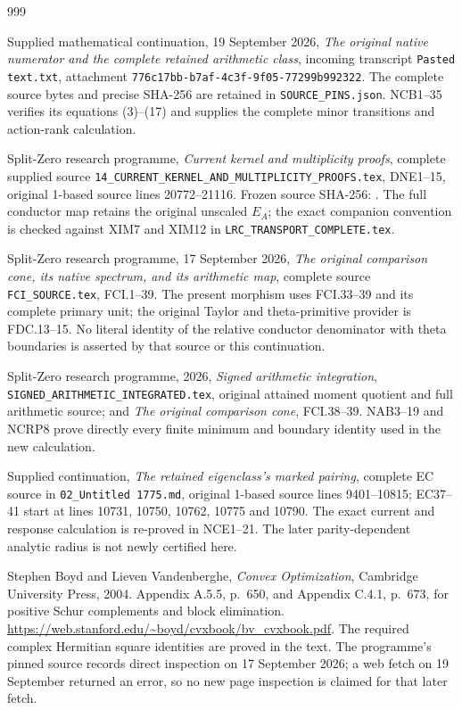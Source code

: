 \begin{thebibliography}{999}

Supplied mathematical continuation, 19 September 2026,
\emph{The original native numerator and the complete retained arithmetic class},
incoming transcript \texttt{Pasted text.txt}, attachment
\texttt{776c17bb-b7af-4c3f-9f05-77299b992322}.
The complete source bytes and precise SHA-256 are retained in
\texttt{SOURCE\_PINS.json}. NCB1--35 verifies its equations (3)--(17)
and supplies the complete minor transitions and action-rank calculation.

Split-Zero research programme, \emph{Current kernel and multiplicity proofs},
complete supplied source \texttt{14\_CURRENT\_KERNEL\_AND\_MULTIPLICITY\_PROOFS.tex},
DNE1--15, original 1-based source lines 20772--21116.
Frozen source SHA-256:
.
The full conductor map retains the original unscaled $E_A$;
the exact companion convention is checked against XIM7 and XIM12
in \texttt{LRC\_TRANSPORT\_COMPLETE.tex}.

Split-Zero research programme, 17 September 2026,
\emph{The original comparison cone, its native spectrum, and its arithmetic map},
complete source \texttt{FCI\_SOURCE.tex}, FCI.1--39.
The present morphism uses FCI.33--39 and its complete primary unit;
the original Taylor and theta-primitive provider is FDC.13--15.
No literal identity of the relative conductor denominator with theta
boundaries is asserted by that source or this continuation.

Split-Zero research programme, 2026,
\emph{Signed arithmetic integration},
\texttt{SIGNED\_ARITHMETIC\_INTEGRATED.tex}, original attained
moment quotient and full arithmetic source;
and \emph{The original comparison cone}, FCI.38--39.
NAB3--19 and NCRP8 prove directly every finite minimum and boundary
identity used in the new calculation.

Supplied continuation, \emph{The retained eigenclass's marked pairing},
complete EC source in \texttt{02\_Untitled 1775.md},
original 1-based source lines 9401--10815;
EC37--41 start at lines 10731, 10750, 10762, 10775 and 10790.
The exact current and response calculation is re-proved in NCE1--21.
The later parity-dependent analytic radius is not newly certified here.

Stephen Boyd and Lieven Vandenberghe,
\emph{Convex Optimization}, Cambridge University Press, 2004.
Appendix A.5.5, p.~650, and Appendix C.4.1, p.~673,
for positive Schur complements and block elimination.
\url{https://web.stanford.edu/~boyd/cvxbook/bv_cvxbook.pdf}.
The required complex Hermitian square identities are proved in the text.
The programme's pinned source records direct inspection on
17 September 2026; a web fetch on 19 September returned an error,
so no new page inspection is claimed for that later fetch.


\end{thebibliography}
